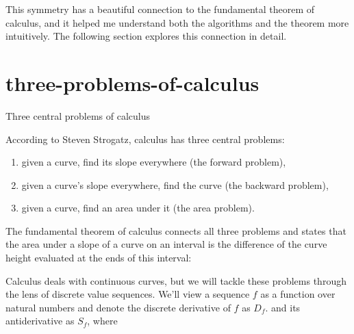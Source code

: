 \documentclass{article}
\begin{document}
This symmetry has a beautiful connection to the fundamental theorem of calculus,
and it helped me understand both the algorithms and the theorem more intuitively.
The following section explores this connection in detail.

\section{three-problems-of-calculus}{Three central problems of calculus}

According to Steven Strogatz, calculus has three central problems:
\begin{enumerate}
\item given a curve, find its slope everywhere (the forward problem),
\item given a curve’s slope everywhere, find the curve (the backward problem),
\item given a curve, find an area under it (the area problem).
\end{enumerate}

The fundamental theorem of calculus connects all three problems
and states that the area under a slope of a curve on an interval
is the difference of the curve height evaluated at the ends of this interval:


Calculus deals with continuous curves, but we will tackle these problems through the lens of discrete value sequences.
We'll view a sequence $f$ as a function over natural numbers
and denote the discrete derivative of $f$ as $D_f$.
and its antiderivative as $S_f$, where

\end{document}
